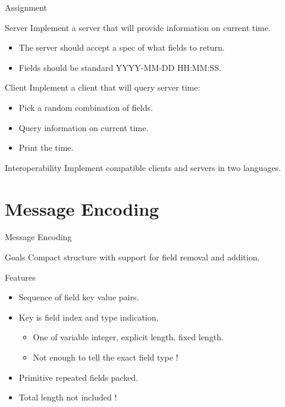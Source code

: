 \begin{frame}{Assignment}
    \begin{block}{Server}
        Implement a server that will provide information on current time.
        \begin{itemize}
            \item The server should accept a spec of what fields to return.
            \item Fields should be standard YYYY-MM-DD HH:MM:SS.
        \end{itemize}
    \end{block}

    \begin{block}{Client}
        Implement a client that will query server time:
        \begin{itemize}
            \item Pick a random combination of fields.
            \item Query information on current time.
            \item Print the time.
        \end{itemize}
    \end{block}

    \begin{block}{Interoperability}
        Implement compatible clients and servers in two languages.
    \end{block}
\end{frame}


\section{Message Encoding}


\begin{frame}{Message Encoding}
    \begin{block}{Goals}
        Compact structure with support for field removal and addition.
    \end{block}

    \bigskip

    \begin{block}{Features}
        \begin{itemize}
            \item Sequence of field key value pairs.
            \item Key is field index and type indication.
                \begin{itemize}
                    \item One of variable integer, explicit length, fixed length.
                    \item Not enough to tell the exact field type !
                \end{itemize}
            \item Primitive repeated fields packed.
            \item Total length not included !
        \end{itemize}
    \end{block}
\end{frame}


